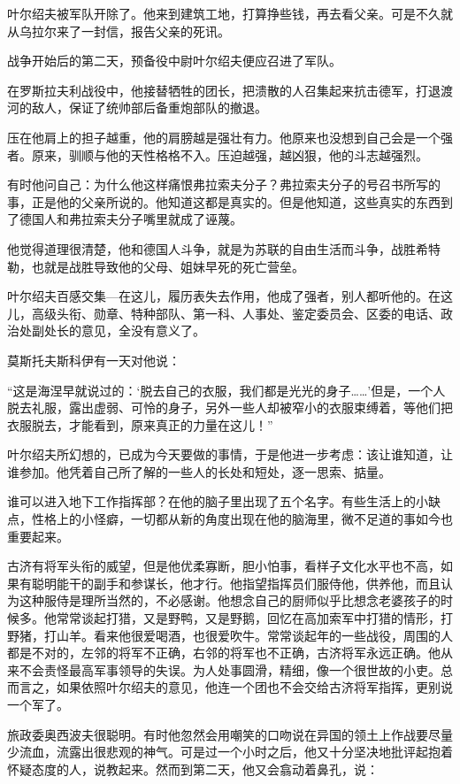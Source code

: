 叶尔绍夫被军队开除了。他来到建筑工地，打算挣些钱，再去看父亲。可是不久就从乌拉尔来了一封信，报告父亲的死讯。

战争开始后的第二天，预备役中尉叶尔绍夫便应召进了军队。

在罗斯拉夫利战役中，他接替牺牲的团长，把溃散的人召集起来抗击德军，打退渡河的敌人，保证了统帅部后备重炮部队的撤退。

压在他肩上的担子越重，他的肩膀越是强壮有力。他原来也没想到自己会是一个强者。原来，驯顺与他的天性格格不入。压迫越强，越凶狠，他的斗志越强烈。

有时他问自己：为什么他这样痛恨弗拉索夫分子？弗拉索夫分子的号召书所写的事，正是他的父亲所说的。他知道这都是真实的。但是他知道，这些真实的东西到了德国人和弗拉索夫分子嘴里就成了诬蔑。

他觉得道理很清楚，他和德国人斗争，就是为苏联的自由生活而斗争，战胜希特勒，也就是战胜导致他的父母、姐妹早死的死亡营垒。

叶尔绍夫百感交集—在这儿，履历表失去作用，他成了强者，别人都听他的。在这儿，高级头衔、勋章、特种部队、第一科、人事处、鉴定委员会、区委的电话、政治处副处长的意见，全没有意义了。

莫斯托夫斯科伊有一天对他说：

“这是海涅早就说过的：‘脱去自己的衣服，我们都是光光的身子……’但是，一个人脱去礼服，露出虚弱、可怜的身子，另外一些人却被窄小的衣服束缚着，等他们把衣服脱去，才能看到，原来真正的力量在这儿！”

叶尔绍夫所幻想的，已成为今天要做的事情，于是他进一步考虑：该让谁知道，让谁参加。他凭着自己所了解的一些人的长处和短处，逐一思索、掂量。

谁可以进入地下工作指挥部？在他的脑子里出现了五个名字。有些生活上的小缺点，性格上的小怪癖，一切都从新的角度出现在他的脑海里，微不足道的事如今也重要起来。

古济有将军头衔的威望，但是他优柔寡断，胆小怕事，看样子文化水平也不高，如果有聪明能干的副手和参谋长，他才行。他指望指挥员们服侍他，供养他，而且认为这种服侍是理所当然的，不必感谢。他想念自己的厨师似乎比想念老婆孩子的时候多。他常常谈起打猎，又是野鸭，又是野鹅，回忆在高加索军中打猎的情形，打野猪，打山羊。看来他很爱喝酒，也很爱吹牛。常常谈起年的一些战役，周围的人都是不对的，左邻的将军不正确，右邻的将军也不正确，古济将军永远正确。他从来不会责怪最高军事领导的失误。为人处事圆滑，精细，像一个很世故的小吏。总而言之，如果依照叶尔绍夫的意见，他连一个团也不会交给古济将军指挥，更别说一个军了。

旅政委奥西波夫很聪明。有时他忽然会用嘲笑的口吻说在异国的领土上作战要尽量少流血，流露出很悲观的神气。可是过一个小时之后，他又十分坚决地批评起抱着怀疑态度的人，说教起来。然而到第二天，他又会翕动着鼻孔，说：

